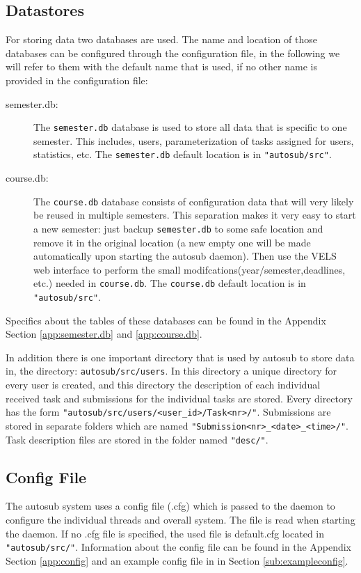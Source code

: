 \subsection{Datastores}
For storing data two databases are used. The name and location of those databases 
can be configured through the configuration file, in the following we will refer to 
them with the default name that is used, if no other name is provided in the 
configuration file:
\begin{description}
\item [semester.db: ] The {\tt semester.db} database is used to store all data that is
    specific to one semester. This includes, users, parameterization of tasks assigned
    for users, statistics, etc. The {\tt semester.db} default location is in
	{\tt "autosub/src"}.
\item [course.db: ] The {\tt course.db} database consists of configuration data that will
    very likely be reused in multiple semesters. This separation makes it very easy
    to start a new semester: just backup {\tt semester.db} to some safe location and
    remove it in the original location (a new empty one will be made automatically upon 
    starting the autosub daemon). Then use the VELS web interface to perform the small 
    modifcations(year/semester,deadlines, etc.) needed in {\tt course.db}. The
    {\tt course.db} default location is in {\tt "autosub/src"}.
\end{description}
Specifics about the tables of these databases can be found in the Appendix Section
\ref{app:semester.db} and \ref{app:course.db}.

In addition there is one important directory that is used by autosub to store data in,
the directory: {\tt autosub/src/users}. In this directory a unique directory for every
user is created, and this directory the description of each individual received task 
and submissions for the individual tasks are stored. Every directory has the form 
{\tt "autosub/src/users/<user\_id>/Task<nr>/"}. Submissions are stored in separate 
folders which are named {\tt "Submission<nr>\_<date>\_<time>/"}. Task description files 
are stored in the folder named {\tt "desc/"}.

\subsection{Config File}
The autosub system uses a config file (.cfg) which is passed to the daemon to configure the
individual threads and overall system. The file is read when starting the daemon. If no
.cfg file is specified, the used file is default.cfg located in {\tt "autosub/src/"}. 
Information about the config file can be found in the Appendix Section \ref{app:config}
and an example config file in in Section \ref{sub:exampleconfig}.

